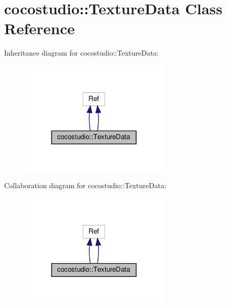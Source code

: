 \hypertarget{classcocostudio_1_1TextureData}{}\section{cocostudio\+:\+:Texture\+Data Class Reference}
\label{classcocostudio_1_1TextureData}


Inheritance diagram for cocostudio\+:\+:Texture\+Data\+:
\nopagebreak
\begin{figure}[H]
\begin{center}
\leavevmode
\includegraphics[width=204pt]{classcocostudio_1_1TextureData__inherit__graph}
\end{center}
\end{figure}


Collaboration diagram for cocostudio\+:\+:Texture\+Data\+:
\nopagebreak
\begin{figure}[H]
\begin{center}
\leavevmode
\includegraphics[width=204pt]{classcocostudio_1_1TextureData__coll__graph}
\end{center}
\end{figure}
